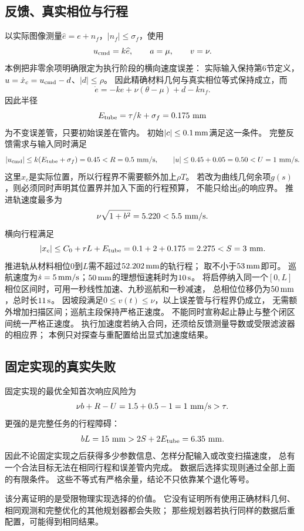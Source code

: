 \documentclass[11pt,a4paper]{article}
\numberwithin{equation}{section}
\theoremstyle{definition}
\begin{document}
\subsection{反馈、真实相位与行程}
以实际图像测量$\widehat e=e+n_f$，$|n_f|\le\sigma_f$，使用
\[
 u_{\rm cmd}=k\widehat e,\qquad a=\mu,\qquad v=\nu .
\]
本例把非零余项明确限定为执行阶段的横向速度误差：
实际输入保持第6节定义，$u=\dot x_c=u_{\rm cmd}-d$、$|d|\le\rho$。
因此精确材料几何与真实相位等式保持成立，而
\[
 \dot e=-ke+\nu(\theta-\mu)+d-kn_f .
\]
因此半径
\[
 E_{\rm tube}=\tau/k+\sigma_f=0.175\ {\rm mm}
\]
为不变误差管，只要初始误差在管内。
初始$|c|\le0.1\,{\rm mm}$满足这一条件。
完整反馈需求与输入同时满足
\[
 |u_{\rm cmd}|\le k(E_{\rm tube}+\sigma_f)=0.45
 <R=0.5\ {\rm mm/s},\qquad
 |u|\le0.45+0.05=0.50<U=1\ {\rm mm/s}.
\]
这里$x_c$是实际位置，所以行程界不需要额外加上$\rho T$。
若改为曲线几何余项$g(s)$，则必须同时声明其位置界并加入下面的行程预算，
不能只给出$\dot g$的响应界。
推进轨速度最多为
\[
 \nu\sqrt{1+b^2}=5.220<5.5\ {\rm mm/s}.
\]
横向行程满足
\[
 |x_c|\le C_0+rL+E_{\rm tube}
 =0.1+2+0.175=2.275<S=3\ {\rm mm}.
\]
推进轨从材料相位$0$到$L$需不超过$52.202\,{\rm mm}$的轨行程；
取不小于$53\,{\rm mm}$即可。
巡航速度为$\dot s=5\,{\rm mm/s}$；$50\,{\rm mm}$的理想恒速耗时为$10\,{\rm s}$。
将启停纳入同一个$[0,L]$相位区间时，可用一秒线性加速、九秒巡航和一秒减速，
总相位位移仍为$50\,{\rm mm}$，总时长$11\,{\rm s}$。
因坡段满足$0\le v(t)\le\nu$，以上误差管与行程界仍成立，
无需额外增加扫描区间；巡航主段保持严格正速度。
不能同时宣称起止静止与整个闭区间统一严格正速度。
执行加速度若纳入合同，还须给反馈测量导数或受限滤波器的相应界；
本例只对探查与重配置给出显式加速度结果。

\subsection{固定实现的真实失败}
固定实现的最优全知首次响应风险为
\[
 \nu b+R-U=1.5+0.5-1=1\ {\rm mm/s}>\tau.
\]
更强的是完整任务的行程障碍：
\[
 bL=15\ {\rm mm}>
 2S+2E_{\rm tube}=6.35\ {\rm mm}.
\]
因此不论固定实现之后获得多少参数信息、怎样分配输入或改变扫描速度，
总有一个合法目标无法在相同行程和误差管内完成。
数据后选择实现则通过全部上面的有限条件。
这些不等式有严格余量，结论不只依靠某个退化等号。

该分离证明的是受限物理实现选择的价值。
它没有证明所有使用正确材料几何、相同观测和完整优化的其他规划器都会失败；
那些规划器若执行同样的数据后重配置，可能得到相同结果。
\end{document}
